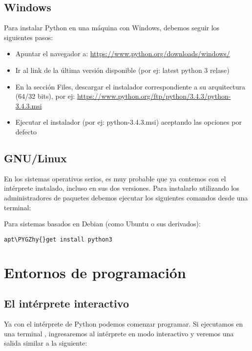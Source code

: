 \documentclass[letterpaper,10pt,spanish]{sphinxmanual}
\def\PYGZhy{\char`\-}
\begin{document}
\subsection{Windows}
\label{Unidad01:windows}
Para instalar Python en una máquina con Windows, debemos seguir los
siguientes pasos:
\begin{itemize}
\item {} 
Apuntar el navegador a: \href{https://www.python.org/downloads/windows/}{https://www.python.org/downloads/windows/}

\item {} 
Ir al link de la última versión disponible (por ej: latest python 3
relase)

\item {} 
En la sección Files, descargar el instalador correspondiente a su
arquitectura (64/32 bits), por ej:
\href{https://www.python.org/ftp/python/3.4.3/python-3.4.3.msi}{https://www.python.org/ftp/python/3.4.3/python-3.4.3.msi}

\item {} 
Ejecutar el instalador (por ej: python-3.4.3.msi) aceptando las
opciones por defecto

\end{itemize}


\subsection{GNU/Linux}
\label{Unidad01:gnu-linux}
En los sistemas operativos serios, es muy probable que ya contemos con
el intérprete instalado, incluso en sus dos versiones. Para instalarlo
utilizando los administradores de paquetes debemos ejecutar los
siguientes comandos desde una terminal:

Para sistemas basados en Debian (como Ubuntu o sus derivados):

\begin{Verbatim}[commandchars=\\\{\}]
apt\PYGZhy{}get install python3
\end{Verbatim}


\section{Entornos de programación}
\label{Unidad01:entornos-de-programacion}

\subsection{El intérprete interactivo}
\label{Unidad01:el-interprete-interactivo}
Ya con el intérprete de Python podemos comenzar programar. Si ejecutamos
en una terminal , ingresaremos al intérprete en modo
interactivo y veremos una salida similar a la siguiente:
\end{document}
